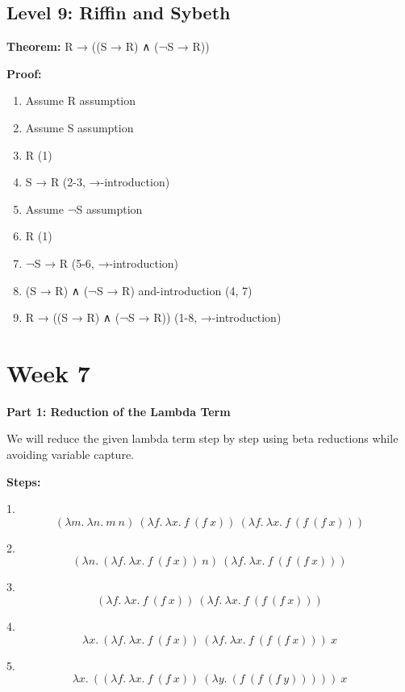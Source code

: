 \documentclass{article}
\theoremstyle{theorem}
\theoremstyle{definition}
\theoremstyle{remark}
\begin{document}
\subsection{Level 9: Riffin and Sybeth}
\textbf{Theorem:} R → ((S → R) ∧ (¬S → R))

\textbf{Proof:}
\begin{enumerate}
    \item Assume R \hfill assumption
    \item Assume S \hfill assumption
    \item R \hfill (1)
    \item S → R \hfill (2-3, →-introduction)
    \item Assume ¬S \hfill assumption
    \item R \hfill (1)
    \item ¬S → R \hfill (5-6, →-introduction)
    \item (S → R) ∧ (¬S → R) \hfill and-introduction (4, 7)
    \item R → ((S → R) ∧ (¬S → R)) \hfill (1-8, →-introduction)
\end{enumerate}


\section{Week 7}
\textbf{Part 1: Reduction of the Lambda Term}

We will reduce the given lambda term step by step using beta reductions while avoiding variable capture.

\textbf{Steps:}

1. \[
\left( \lambda m.\ \lambda n.\ m\ n \right)\ \left( \lambda f.\ \lambda x.\ f\ (f\ x) \right)\ \left( \lambda f.\ \lambda x.\ f\ \left( f\ \left( f\ x \right) \right) \right)
\]

2. \[
\left( \lambda n.\ \left( \lambda f.\ \lambda x.\ f\ (f\ x) \right)\ n \right)\ \left( \lambda f.\ \lambda x.\ f\ \left( f\ \left( f\ x \right) \right) \right)
\]

3. \[
\left( \lambda f.\ \lambda x.\ f\ (f\ x) \right)\ \left( \lambda f.\ \lambda x.\ f\ \left( f\ \left( f\ x \right) \right) \right)
\]

4. \[
\lambda x.\ \left( \lambda f.\ \lambda x.\ f\ (f\ x) \right)\ \left( \lambda f.\ \lambda x.\ f\ \left( f\ \left( f\ x \right) \right) \right)\ x
\]

5. \[
\lambda x.\ \left( \left( \lambda f.\ \lambda x.\ f\ (f\ x) \right)\ \left( \lambda y.\ \left( f\ \left( f\ \left( f\ y \right) \right) \right) \right) \right)\ x
\]
\end{document}
